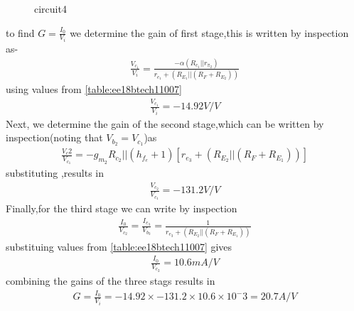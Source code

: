 \begin{enumerate}[label=\thesubsection.\arabic*.,ref=\thesubsection.\theenumi]
\begin{figure}[!ht]
\begin{center}
		\resizebox{\columnwidth}{!}{}
	\end{center}
\caption{circuit4}
\label{fig:circuit4}
\end{figure}
to find $G=\frac{I_0}{V_i}$ we determine the gain of first stage,this is written by inspection as-
\begin{align}
    \frac{V_c_1}{V_i}=\frac{-\alpha(R_c_1||r_\pi_2)}{r_e_1+(R_E_1||(R_F+R_E_2))}
\end{align}
using values from \ref{table:ee18btech11007}
\begin{align}
\frac{V_c_1}{V_i}=-14.92V/V     
\end{align}
Next, we determine the gain of the second stage,which can be written by inspection(noting that $V_b_2=V_c_1$)as
{\small \begin{align}
    \frac{V_c2}{V_c_1}=-g_m_2{R_c_2||(h_f_e+1)[r_e_3+(R_E_2||(R_F+R_E_1))]}
\end{align}}%
substituting ,results in 
\begin{align}
    \frac{V_c_2}{V_c_1}=-131.2 V/V
\end{align}
Finally,for the third stage we can write by inspection
{\small \begin{align}
    \frac{I_0}{V_c_2}=\frac{I_e_3}{V_b_3}=\frac{1}{r_e_3+(R_E_2||(R_F+R_E_1))}
\end{align}}%
substituing values from \ref{table:ee18btech11007} gives
\begin{align}
    \frac{I_0}{V_c_2}=10.6mA/V
\end{align}
combining the gains of the three stags results in
{\small 
\begin{align}
G=\frac{I_0}{V_i}=-14.92\times-131.2\times10.6\times10^-3=20.7A/V    
\end{align}}%


\end{enumerate}
